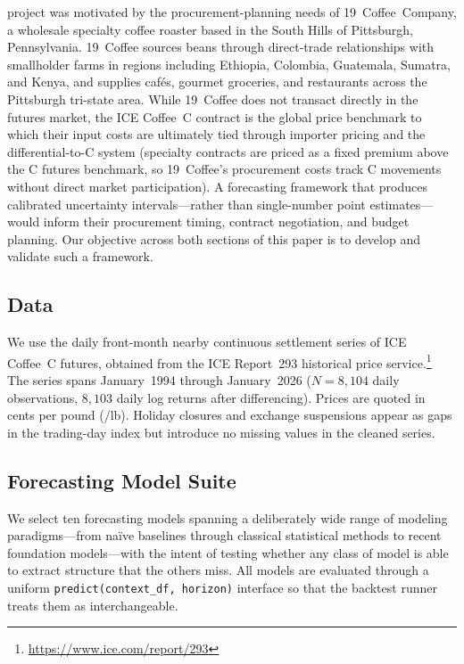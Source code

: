 \documentclass[journal]{IEEEtran}
\begin{document}
 project was motivated by the procurement-planning
needs of 19~Coffee~Company, a wholesale specialty coffee roaster based in
the South Hills of Pittsburgh, Pennsylvania.  19~Coffee sources beans
through direct-trade relationships with smallholder farms in regions
including Ethiopia, Colombia, Guatemala, Sumatra, and Kenya, and supplies
caf\'es, gourmet groceries, and restaurants across the Pittsburgh tri-state
area.  While 19~Coffee does not transact directly in the futures market,
the ICE Coffee~C contract is the global price benchmark to which their
input costs are ultimately tied through importer pricing and the
differential-to-C system (specialty contracts are priced as a fixed
premium above the C futures benchmark, so 19~Coffee's procurement costs
track C movements without direct market participation).  A
forecasting framework that produces calibrated uncertainty
intervals---rather than single-number point estimates---would inform
their procurement timing, contract negotiation, and budget planning.
Our objective across both sections of this paper is to develop and
validate such a framework.

\subsection{Data}
\label{sec:data_section1}

We use the daily front-month nearby continuous settlement series of ICE
Coffee~C futures, obtained from the ICE Report~293 historical price
service.\footnote{\url{https://www.ice.com/report/293}}  The series spans
January~1994 through January~2026 ($N = 8{,}104$ daily observations,
$8{,}103$ daily log returns after differencing).  Prices are quoted in
cents per pound (\textcent/lb).  Holiday closures and exchange suspensions
appear as gaps in the trading-day index but introduce no missing values in
the cleaned series.

\subsection{Forecasting Model Suite}
\label{sec:models_section1}

We select ten forecasting models spanning a deliberately wide range of
modeling paradigms---from na\"ive baselines through classical statistical
methods to recent foundation models---with the intent of testing whether
any class of model is able to extract structure that the others miss.  All models are evaluated through a uniform
\verb|predict(context_df, horizon)| interface so that the backtest runner
treats them as interchangeable.
\end{document}
